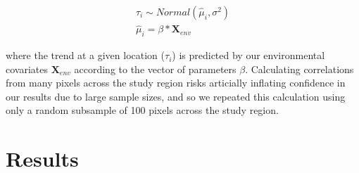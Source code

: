 \documentclass[11pt]{article}
\begin{document}
\begin{subequations}
	\label{eq:trends}
	\begin{align}
		\tau_{i} \sim Normal(\hat{\mu}_{i}, \sigma^2) \\
	\hat{\mu}_{i}= \beta *\mathbf{X}_{env}
	\end{align}
\end{subequations}

where the trend at a given location ($\tau_{i}$) is predicted by our environmental covariates {$\mathbf{X}_{env}$} according to the vector of parameters $\beta$. 
Calculating correlations from many pixels across the study region risks articially inflating confidence in our results due to large sample sizes, and so we repeated this calculation using only a random subsample of 100 pixels across the study region.




		
\section*{Results}
\end{document}
